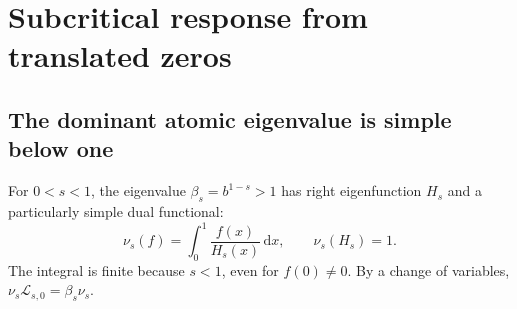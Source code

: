 \documentclass[11pt,a4paper]{article}
\numberwithin{equation}{section}
\theoremstyle{definition}
\theoremstyle{remark}
\newcommand{\dd}{\,\mathrm d}
\newcommand{\Lop}{\mathcal L}
\begin{document}
\section{Subcritical response from translated zeros}
\label{sec:subcritical}

\subsection{The dominant atomic eigenvalue is simple below one}
For $0<s<1$, the eigenvalue $\beta_s=b^{1-s}>1$ has right eigenfunction
$H_s$ and a particularly simple dual functional:
\begin{equation}
 \nu_s(f)=\int_0^1\frac{f(x)}{H_s(x)}\dd x,
 \qquad \nu_s(H_s)=1.
 \label{eq:subcritical-dual}
\end{equation}
The integral is finite because $s<1$, even for $f(0)\ne0$.
By a change of variables, $\nu_s\Lop_{s,0}=\beta_s\nu_s$.
\end{document}
